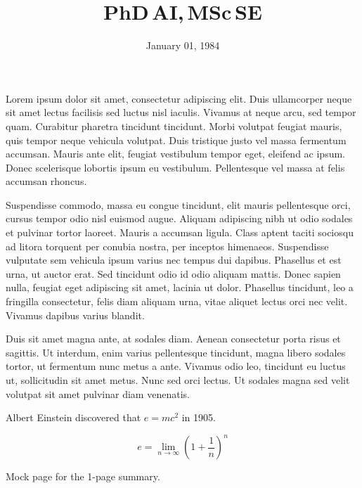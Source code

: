 \documentclass[11pt,a4paper,sans]{moderncv}
\title{PhD{\smaller[2]\,AI},\,MSc{\smaller[2]\,SE}}
\date{January 01, 1984}
\begin{document}
\makelettertitle

Lorem ipsum dolor sit amet, consectetur adipiscing elit. Duis ullamcorper neque sit amet lectus facilisis sed luctus nisl iaculis. Vivamus at neque arcu, sed tempor quam. Curabitur pharetra tincidunt tincidunt. Morbi volutpat feugiat mauris, quis tempor neque vehicula volutpat. Duis tristique justo vel massa fermentum accumsan. Mauris ante elit, feugiat vestibulum tempor eget, eleifend ac ipsum. Donec scelerisque lobortis ipsum eu vestibulum. Pellentesque vel massa at felis accumsan rhoncus.

Suspendisse commodo, massa eu congue tincidunt, elit mauris pellentesque orci, cursus tempor odio nisl euismod augue. Aliquam adipiscing nibh ut odio sodales et pulvinar tortor laoreet. Mauris a accumsan ligula. Class aptent taciti sociosqu ad litora torquent per conubia nostra, per inceptos himenaeos. Suspendisse vulputate sem vehicula ipsum varius nec tempus dui dapibus. Phasellus et est urna, ut auctor erat. Sed tincidunt odio id odio aliquam mattis. Donec sapien nulla, feugiat eget adipiscing sit amet, lacinia ut dolor. Phasellus tincidunt, leo a fringilla consectetur, felis diam aliquam urna, vitae aliquet lectus orci nec velit. Vivamus dapibus varius blandit.

Duis sit amet magna ante, at sodales diam. Aenean consectetur porta risus et sagittis. Ut interdum, enim varius pellentesque tincidunt, magna libero sodales tortor, ut fermentum nunc metus a ante. Vivamus odio leo, tincidunt eu luctus ut, sollicitudin sit amet metus. Nunc sed orci lectus. Ut sodales magna sed velit volutpat sit amet pulvinar diam venenatis.

Albert Einstein discovered that $e=mc^2$ in 1905.

\[ e=\lim_{n \to \infty} \left(1+\frac{1}{n}\right)^n \]

\makeletterclosing

\clearpage
\makecvtitle





% 

\clearpage
\maketitle{}


\clearpage
\maketitle{}
Mock page for the 1-page summary.
\end{document}
